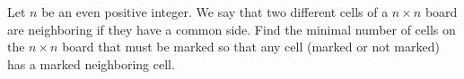 Let $n$ be an even positive integer. We say that two different cells of a $n \times n$ board are neighboring if they have a common side. Find the minimal number of cells on the $n \times n$ board that must be marked so that any cell (marked or not marked) has a marked neighboring cell.